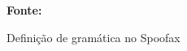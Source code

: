 \begin{figure}[h!]
\centering

\caption{\textmd{Definição de gramática no Spoofax}}
\label{fig:spoofaxgramatica}

\par\medskip\textbf{Fonte:} \cite{kats2010spoofax} \par\medskip
\end{figure}
